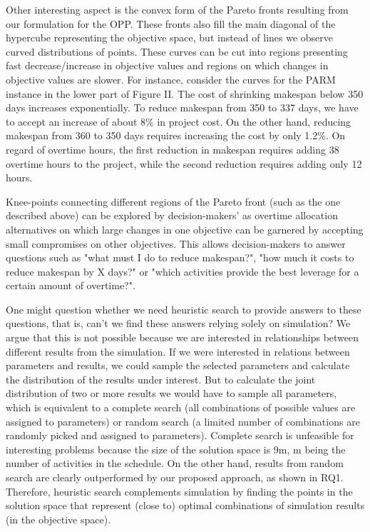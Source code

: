 \documentclass[conference]{IEEEtran}
\begin{document}
Other interesting aspect is the convex form of the Pareto fronts resulting from our formulation for the OPP. These fronts also fill the main diagonal of the hypercube representing the objective space, but instead of lines we observe curved distributions of points. These curves can be cut into regions presenting fast decrease/increase in objective values and regions on which changes in objective values are slower. For instance, consider the curves for the PARM instance in the lower part of Figure II. The cost of shrinking makespan below 350 days increases exponentially. To reduce makespan from 350 to 337 days, we have to accept an increase of about 8\% in project cost. On the other hand, reducing makespan from 360 to 350 days requires increasing the cost by only 1.2\%. On regard of overtime hours, the first reduction in makespan requires adding 38 overtime hours to the project, while the second reduction requires adding only 12 hours. 

Knee-points connecting different regions of the Pareto front (such as the one described above) can be explored by decision-makers' as overtime allocation alternatives on which large changes in one objective can be garnered by accepting small compromises on other objectives. This allows decision-makers to answer questions such as "what must I do to reduce makespan?", "how much it costs to reduce makespan by X days?" or "which activities provide the best leverage for a certain amount of overtime?".

One might question whether we need heuristic search to provide answers to these questions, that is, can't we find these answers relying solely on simulation? We argue that this is not possible because we are interested in relationships between different results from the simulation. If we were interested in relations between parameters and results, we could sample the selected parameters and calculate the distribution of the results under interest. But to calculate the joint distribution of two or more results we would have to sample all parameters, which is equivalent to a complete search (all combinations of possible values are assigned to parameters) or random search (a limited number of combinations are randomly picked and assigned to parameters). Complete search is unfeasible for interesting problems because the size of the solution space is 9m, m being the number of activities in the schedule. On the other hand, results from random search are clearly outperformed by our proposed approach, as shown in RQ1. Therefore, heuristic search complements simulation by finding the points in the solution space that represent (close to) optimal combinations of simulation results (in the objective space).
\end{document}

